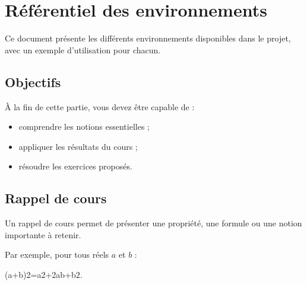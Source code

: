 
\section{Référentiel des environnements}

Ce document présente les différents environnements disponibles dans le projet, avec un exemple d'utilisation pour chacun.


\subsection{Objectifs}

\begin{objectifs}
À la fin de cette partie, vous devez être capable de :
\begin{itemize}
\item comprendre les notions essentielles ;
\item appliquer les résultats du cours ;
\item résoudre les exercices proposés.
\end{itemize}
\end{objectifs}


\subsection{Rappel de cours}

\begin{rappelbox}
Un rappel de cours permet de présenter une propriété, une formule ou une notion importante à retenir.

Par exemple, pour tous réels $a$ et $b$ :

(a+b)2=a2+2ab+b2.

\end{rappelbox}


